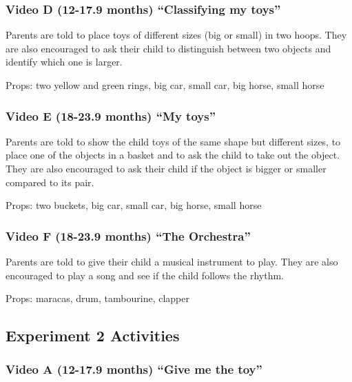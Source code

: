 \documentclass[man,floatsintext]{apa6}
\begin{document}
\begin{appendix}
\hypertarget{video-d-12-17.9-months-classifying-my-toys}{%
\subsubsection{Video D (12-17.9 months) ``Classifying my
toys''}\label{video-d-12-17.9-months-classifying-my-toys}}

Parents are told to place toys of different sizes (big or small) in two
hoops. They are also encouraged to ask their child to distinguish
between two objects and identify which one is larger.

Props: two yellow and green rings, big car, small car, big horse, small
horse

\hypertarget{video-e-18-23.9-months-my-toys}{%
\subsubsection{Video E (18-23.9 months) ``My
toys''}\label{video-e-18-23.9-months-my-toys}}

Parents are told to show the child toys of the same shape but different
sizes, to place one of the objects in a basket and to ask the child to
take out the object. They are also encouraged to ask their child if the
object is bigger or smaller compared to its pair.

Props: two buckets, big car, small car, big horse, small horse

\hypertarget{video-f-18-23.9-months-the-orchestra}{%
\subsubsection{Video F (18-23.9 months) ``The
Orchestra''}\label{video-f-18-23.9-months-the-orchestra}}

Parents are told to give their child a musical instrument to play. They
are also encouraged to play a song and see if the child follows the
rhythm.

Props: maracas, drum, tambourine, clapper

\hypertarget{experiment-2-activities}{%
\subsection{Experiment 2 Activities}\label{experiment-2-activities}}

\hypertarget{video-a-12-17.9-months-give-me-the-toy}{%
\subsubsection{Video A (12-17.9 months) ``Give me the
toy''}\label{video-a-12-17.9-months-give-me-the-toy}}


\end{appendix}
\end{document}
